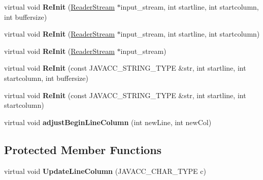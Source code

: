 \begin{DoxyCompactItemize}
virtual void {\bfseries Re\+Init} (\mbox{\hyperlink{class_reader_stream}{Reader\+Stream}} $\ast$input\+\_\+stream, int startline, int startcolumn, int buffersize)
\item 
\mbox{\label{classvhdl_1_1parser_1_1_char_stream_a93c0e6b18d38b9df067c39ca157df86a}} 
virtual void {\bfseries Re\+Init} (\mbox{\hyperlink{class_reader_stream}{Reader\+Stream}} $\ast$input\+\_\+stream, int startline, int startcolumn)
\item 
\mbox{\label{classvhdl_1_1parser_1_1_char_stream_a147a1e6e2f7cc4d9dc423bc40a542a66}} 
virtual void {\bfseries Re\+Init} (\mbox{\hyperlink{class_reader_stream}{Reader\+Stream}} $\ast$input\+\_\+stream)
\item 
\mbox{\label{classvhdl_1_1parser_1_1_char_stream_aa63473f578fa18b87448b995e99b06b5}} 
virtual void {\bfseries Re\+Init} (const J\+A\+V\+A\+C\+C\+\_\+\+S\+T\+R\+I\+N\+G\+\_\+\+T\+Y\+PE \&str, int startline, int startcolumn, int buffersize)
\item 
\mbox{\label{classvhdl_1_1parser_1_1_char_stream_afdf2ecf97212d2b2a48d630c3a8e5521}} 
virtual void {\bfseries Re\+Init} (const J\+A\+V\+A\+C\+C\+\_\+\+S\+T\+R\+I\+N\+G\+\_\+\+T\+Y\+PE \&str, int startline, int startcolumn)
\item 
\mbox{\label{classvhdl_1_1parser_1_1_char_stream_adbbf03df44c5e7100b068945c6a318c0}} 
virtual void {\bfseries adjust\+Begin\+Line\+Column} (int new\+Line, int new\+Col)
\end{DoxyCompactItemize}
\subsection*{Protected Member Functions}
\begin{DoxyCompactItemize}
\item 
\mbox{\label{classvhdl_1_1parser_1_1_char_stream_a854b05bdd3eb436307efd3e5bd14fd7d}} 
virtual void {\bfseries Update\+Line\+Column} (J\+A\+V\+A\+C\+C\+\_\+\+C\+H\+A\+R\+\_\+\+T\+Y\+PE c)
\end{DoxyCompactItemize}
